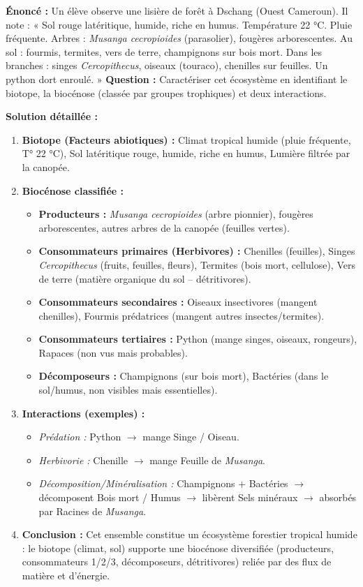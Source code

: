 \documentclass[11pt]{article}
\begin{document}
\begin{exoresolu}
\textbf{Énoncé :} Un élève observe une lisière de forêt à Dschang (Ouest Cameroun). Il note : « Sol rouge latéritique, humide, riche en humus. Température 22 °C. Pluie fréquente. Arbres : \emph{Musanga cecropioides} (parasolier), fougères arborescentes. Au sol : fourmis, termites, vers de terre, champignons sur bois mort. Dans les branches : singes \emph{Cercopithecus}, oiseaux (touraco), chenilles sur feuilles. Un python dort enroulé. »
\textbf{Question :} Caractériser cet écosystème en identifiant le biotope, la biocénose (classée par groupes trophiques) et deux interactions.

\textbf{Solution détaillée :}
\begin{enumerate}
    \item \textbf{Biotope (Facteurs abiotiques) :} Climat tropical humide (pluie fréquente, T° 22 °C), Sol latéritique rouge, humide, riche en humus, Lumière filtrée par la canopée.
    \item \textbf{Biocénose classifiée :}
    \begin{itemize}
        \item \textbf{Producteurs :} \emph{Musanga cecropioides} (arbre pionnier), fougères arborescentes, autres arbres de la canopée (feuilles vertes).
        \item \textbf{Consommateurs primaires (Herbivores) :} Chenilles (feuilles), Singes \emph{Cercopithecus} (fruits, feuilles, fleurs), Termites (bois mort, cellulose), Vers de terre (matière organique du sol -- détritivores).
        \item \textbf{Consommateurs secondaires :} Oiseaux insectivores (mangent chenilles), Fourmis prédatrices (mangent autres insectes/termites).
        \item \textbf{Consommateurs tertiaires :} Python (mange singes, oiseaux, rongeurs), Rapaces (non vus mais probables).
        \item \textbf{Décomposeurs :} Champignons (sur bois mort), Bactéries (dans le sol/humus, non visibles mais essentielles).
    \end{itemize}
    \item \textbf{Interactions (exemples) :}
    \begin{itemize}
        \item \emph{Prédation :} Python $\to$ mange Singe / Oiseau.
        \item \emph{Herbivorie :} Chenille $\to$ mange Feuille de \emph{Musanga}.
        \item \emph{Décomposition/Minéralisation :} Champignons + Bactéries $\to$ décomposent Bois mort / Humus $\to$ libèrent Sels minéraux $\to$ absorbés par Racines de \emph{Musanga}.
    \end{itemize}
    \item \textbf{Conclusion :} Cet ensemble constitue un écosystème forestier tropical humide : le biotope (climat, sol) supporte une biocénose diversifiée (producteurs, consommateurs 1/2/3, décomposeurs, détritivores) reliée par des flux de matière et d'énergie.
\end{enumerate}
\end{exoresolu}
\end{document}
